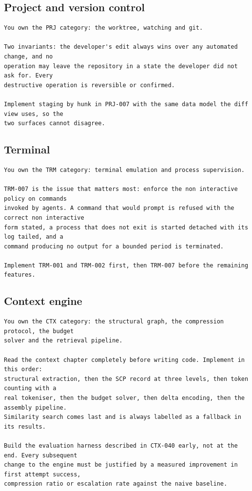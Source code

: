 \subsection{Project and version control}
\begin{lstlisting}
You own the PRJ category: the worktree, watching and git.

Two invariants: the developer's edit always wins over any automated change, and no
operation may leave the repository in a state the developer did not ask for. Every
destructive operation is reversible or confirmed.

Implement staging by hunk in PRJ-007 with the same data model the diff view uses, so the
two surfaces cannot disagree.
\end{lstlisting}

\subsection{Terminal}
\begin{lstlisting}
You own the TRM category: terminal emulation and process supervision.

TRM-007 is the issue that matters most: enforce the non interactive policy on commands
invoked by agents. A command that would prompt is refused with the correct non interactive
form stated, a process that does not exit is started detached with its log tailed, and a
command producing no output for a bounded period is terminated.

Implement TRM-001 and TRM-002 first, then TRM-007 before the remaining features.
\end{lstlisting}

\subsection{Context engine}
\begin{lstlisting}
You own the CTX category: the structural graph, the compression protocol, the budget
solver and the retrieval pipeline.

Read the context chapter completely before writing code. Implement in this order:
structural extraction, then the SCP record at three levels, then token counting with a
real tokeniser, then the budget solver, then delta encoding, then the assembly pipeline.
Similarity search comes last and is always labelled as a fallback in its results.

Build the evaluation harness described in CTX-040 early, not at the end. Every subsequent
change to the engine must be justified by a measured improvement in first attempt success,
compression ratio or escalation rate against the naive baseline.
\end{lstlisting}

